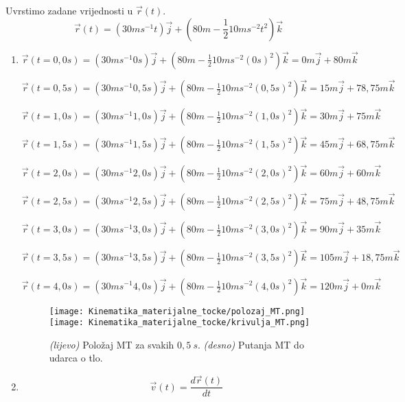
Uvrstimo zadane vrijednosti u $\vec{r}(t)$.
$$
\vec{r}(t)=(30ms^{-1}t) \vec{j} +(80m-\frac{1}{2}10ms^{-2}t^2 )\vec{k}
$$

\begin{enumerate}[label=\alph*)]
  \item $ \vec{r}(t=0,0s)=(30ms^{-1}0s) \vec{j} +(80m-\frac{1}{2}10ms^{-2}(0s)^2 )\vec{k}= 0m\vec{j}+80m\vec{k}$
  
  $ \vec{r}(t=0,5s)=(30ms^{-1}0,5s) \vec{j} +(80m-\frac{1}{2}10ms^{-2}(0,5s)^2 )\vec{k}= 15m\vec{j}+78,75m\vec{k}$
  
  $ \vec{r}(t=1,0s)=(30ms^{-1}1,0s) \vec{j} +(80m-\frac{1}{2}10ms^{-2}(1,0s)^2 )\vec{k}= 30m\vec{j}+75m\vec{k}$
  
  $ \vec{r}(t=1,5s)=(30ms^{-1}1,5s) \vec{j} +(80m-\frac{1}{2}10ms^{-2}(1,5s)^2 )\vec{k}= 45m\vec{j}+68,75m\vec{k}$
  
  $ \vec{r}(t=2,0s)=(30ms^{-1}2,0s) \vec{j} +(80m-\frac{1}{2}10ms^{-2}(2,0s)^2 )\vec{k}= 60m\vec{j}+60m\vec{k}$
  
  $ \vec{r}(t=2,5s)=(30ms^{-1}2,5s) \vec{j} +(80m-\frac{1}{2}10ms^{-2}(2,5s)^2 )\vec{k}= 75m\vec{j}+48,75m\vec{k}$
   
  $ \vec{r}(t=3,0s)=(30ms^{-1}3,0s) \vec{j} +(80m-\frac{1}{2}10ms^{-2}(3,0s)^2 )\vec{k}= 90m\vec{j}+35m\vec{k}$
  
  $ \vec{r}(t=3,5s)=(30ms^{-1}3,5s) \vec{j} +(80m-\frac{1}{2}10ms^{-2}(3,5s)^2 )\vec{k}= 105m\vec{j}+18,75m\vec{k}$

  $ \vec{r}(t=4,0s)=(30ms^{-1}4,0s) \vec{j} +(80m-\frac{1}{2}10ms^{-2}(4,0s)^2 )\vec{k}= 120m\vec{j}+0m\vec{k}$

\begin{figure}
  \centering
  \texttt{[image: Kinematika\_materijalne\_tocke/polozaj\_MT.png]}
  \centering
  \texttt{[image: Kinematika\_materijalne\_tocke/krivulja\_MT.png]}
\caption{\textit{(lijevo)} Položaj MT za svakih $0,5\ s$. \textit{(desno)} Putanja MT do udarca o tlo.}
\end{figure}
 
 
 
 \item $$\vec{v}(t)  = \frac{d\vec{r}(t)}{dt}$$
  

\end{enumerate}
